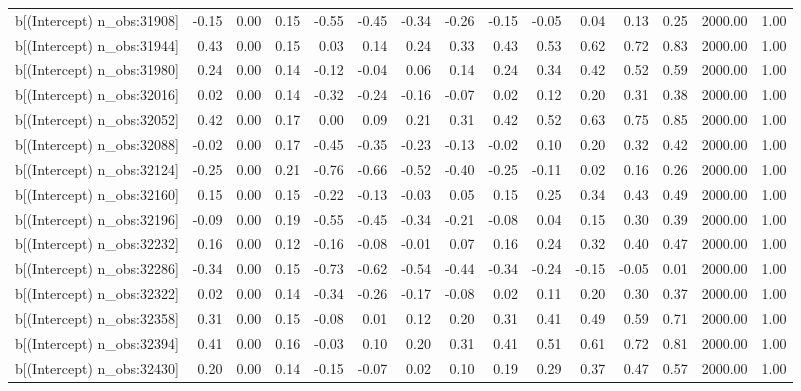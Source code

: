 \begin{table}[ht]
\begin{tabular}{rrrrrrrrrrrrrrr}
  b[(Intercept) n\_obs:31908] & -0.15 & 0.00 & 0.15 & -0.55 & -0.45 & -0.34 & -0.26 & -0.15 & -0.05 & 0.04 & 0.13 & 0.25 & 2000.00 & 1.00 \\ 
  b[(Intercept) n\_obs:31944] & 0.43 & 0.00 & 0.15 & 0.03 & 0.14 & 0.24 & 0.33 & 0.43 & 0.53 & 0.62 & 0.72 & 0.83 & 2000.00 & 1.00 \\ 
  b[(Intercept) n\_obs:31980] & 0.24 & 0.00 & 0.14 & -0.12 & -0.04 & 0.06 & 0.14 & 0.24 & 0.34 & 0.42 & 0.52 & 0.59 & 2000.00 & 1.00 \\ 
  b[(Intercept) n\_obs:32016] & 0.02 & 0.00 & 0.14 & -0.32 & -0.24 & -0.16 & -0.07 & 0.02 & 0.12 & 0.20 & 0.31 & 0.38 & 2000.00 & 1.00 \\ 
  b[(Intercept) n\_obs:32052] & 0.42 & 0.00 & 0.17 & 0.00 & 0.09 & 0.21 & 0.31 & 0.42 & 0.52 & 0.63 & 0.75 & 0.85 & 2000.00 & 1.00 \\ 
  b[(Intercept) n\_obs:32088] & -0.02 & 0.00 & 0.17 & -0.45 & -0.35 & -0.23 & -0.13 & -0.02 & 0.10 & 0.20 & 0.32 & 0.42 & 2000.00 & 1.00 \\ 
  b[(Intercept) n\_obs:32124] & -0.25 & 0.00 & 0.21 & -0.76 & -0.66 & -0.52 & -0.40 & -0.25 & -0.11 & 0.02 & 0.16 & 0.26 & 2000.00 & 1.00 \\ 
  b[(Intercept) n\_obs:32160] & 0.15 & 0.00 & 0.15 & -0.22 & -0.13 & -0.03 & 0.05 & 0.15 & 0.25 & 0.34 & 0.43 & 0.49 & 2000.00 & 1.00 \\ 
  b[(Intercept) n\_obs:32196] & -0.09 & 0.00 & 0.19 & -0.55 & -0.45 & -0.34 & -0.21 & -0.08 & 0.04 & 0.15 & 0.30 & 0.39 & 2000.00 & 1.00 \\ 
  b[(Intercept) n\_obs:32232] & 0.16 & 0.00 & 0.12 & -0.16 & -0.08 & -0.01 & 0.07 & 0.16 & 0.24 & 0.32 & 0.40 & 0.47 & 2000.00 & 1.00 \\ 
  b[(Intercept) n\_obs:32286] & -0.34 & 0.00 & 0.15 & -0.73 & -0.62 & -0.54 & -0.44 & -0.34 & -0.24 & -0.15 & -0.05 & 0.01 & 2000.00 & 1.00 \\ 
  b[(Intercept) n\_obs:32322] & 0.02 & 0.00 & 0.14 & -0.34 & -0.26 & -0.17 & -0.08 & 0.02 & 0.11 & 0.20 & 0.30 & 0.37 & 2000.00 & 1.00 \\ 
  b[(Intercept) n\_obs:32358] & 0.31 & 0.00 & 0.15 & -0.08 & 0.01 & 0.12 & 0.20 & 0.31 & 0.41 & 0.49 & 0.59 & 0.71 & 2000.00 & 1.00 \\ 
  b[(Intercept) n\_obs:32394] & 0.41 & 0.00 & 0.16 & -0.03 & 0.10 & 0.20 & 0.31 & 0.41 & 0.51 & 0.61 & 0.72 & 0.81 & 2000.00 & 1.00 \\ 
  b[(Intercept) n\_obs:32430] & 0.20 & 0.00 & 0.14 & -0.15 & -0.07 & 0.02 & 0.10 & 0.19 & 0.29 & 0.37 & 0.47 & 0.57 & 2000.00 & 1.00 \\ 

\end{tabular}
\end{table}
